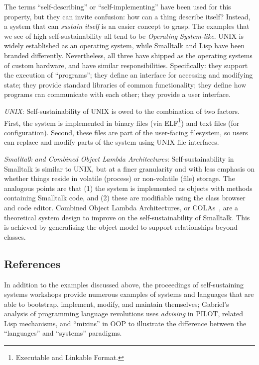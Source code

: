 \documentclass[ twoside,openright,titlepage,numbers=noenddot,headinclude,footinclude,cleardoublepage=empty,abstract=on,
                BCOR=5mm,paper=a4,fontsize=11pt
                ]{scrreprt}
\theoremstyle{definition}
\begin{document}
The terms ``self-describing'' or ``self-implementing'' have been used
for this property, but they can invite confusion: how can a thing
describe itself? Instead, a system that can \emph{sustain itself} is an
easier concept to grasp. The examples that we see of high
self-sustainability all tend to be \emph{Operating System-like}. UNIX is
widely established as an operating system, while Smalltalk and Lisp have
been branded differently. Nevertheless, all three have shipped as the
operating systems of custom hardware, and have similar responsibilities.
Specifically: they support the execution of ``programs''; they define an
interface for accessing and modifying state; they provide standard
libraries of common functionality; they define how programs can
communicate with each other; they provide a user interface.

\emph{UNIX}: Self-sustainability of UNIX is owed to the combination of
two factors. First, the system is implemented in binary files (via
ELF\footnote{Executable and Linkable Format.}) and text files (for
configuration). Second, these files are part of the user-facing
filesystem, so users can replace and modify parts of the system using
UNIX file interfaces.

\emph{Smalltalk and Combined Object Lambda Architectures}:
Self-sustainability in Smalltalk is similar to UNIX, but at a finer
granularity and with less emphasis on whether things reside in volatile
(process) or non-volatile (file) storage. The analogous points are that
(1) the system is implemented as objects with methods containing
Smalltalk code, and (2) these are modifiable using the class browser and
code editor. Combined Object Lambda Architectures, or
COLAs~\parencite{COLAs}, are a theoretical system design to improve on
the self-sustainability of Smalltalk. This is achieved by generalising
the object model to support relationships beyond classes.

\hypertarget{references-2}{\subsection{References}\label{references-2}}

In addition to the examples discussed above, the proceedings of
self-sustaining systems workshops
\parencite{SelfSustaining2008,SelfSustaining2010} provide numerous
examples of systems and languages that are able to bootstrap, implement,
modify, and maintain themselves; Gabriel's analysis of programming
language revolutions \parencite{PLrev} uses \emph{advising} in PILOT,
related Lisp mechanisms, and ``mixins'' in OOP to illustrate the
difference between the ``languages'' and ``systems'' paradigms.
\end{document}
